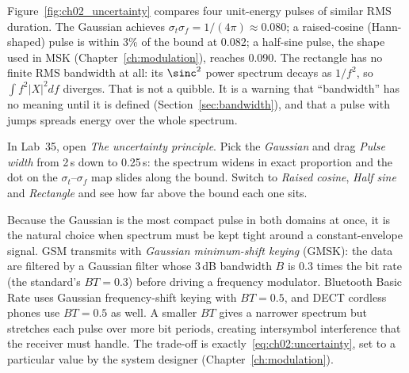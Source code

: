 Figure~\ref{fig:ch02_uncertainty} compares four unit-energy pulses of similar RMS duration. The
Gaussian achieves $\sigma_t\sigma_f=1/(4\pi)\approx0.080$; a raised-cosine (Hann-shaped) pulse is
within 3\% of the bound at 0.082; a half-sine pulse, the shape used in MSK
(Chapter~\ref{ch:modulation}), reaches 0.090. The rectangle has no finite RMS bandwidth at all: its
$\sinc^2$ power spectrum decays as $1/f^2$, so $\int f^2|X|^2df$ diverges. That is not a quibble. It
is a warning that ``bandwidth'' has no meaning until it is defined
(Section~\ref{sec:bandwidth}), and that a pulse with jumps spreads energy over the whole spectrum.

\begin{tryit}
In Lab~35, open \emph{The uncertainty principle}. Pick the \emph{Gaussian} and drag \emph{Pulse
width} from 2\,s down to 0.25\,s: the spectrum widens in exact proportion and the dot on the
$\sigma_t$--$\sigma_f$ map slides along the bound. Switch to \emph{Raised cosine}, \emph{Half sine}
and \emph{Rectangle} and see how far above the bound each one sits.
\end{tryit}


\begin{inpractice}
Because the Gaussian is the most compact pulse in both domains at once, it is the natural choice
when spectrum must be kept tight around a constant-envelope signal. GSM transmits with
\emph{Gaussian minimum-shift keying} (GMSK): the data are filtered by a Gaussian filter whose
3\,dB bandwidth $B$ is $0.3$ times the bit rate (the standard's $BT=0.3$) before driving a frequency
modulator. Bluetooth Basic Rate uses Gaussian frequency-shift keying with $BT=0.5$, and DECT
cordless phones use $BT=0.5$ as well. A smaller $BT$ gives a narrower spectrum but stretches each
pulse over more bit periods, creating intersymbol interference that the receiver must handle. The
trade-off is exactly~\eqref{eq:ch02:uncertainty}, set to a particular value by the system
designer (Chapter~\ref{ch:modulation}).
\end{inpractice}

